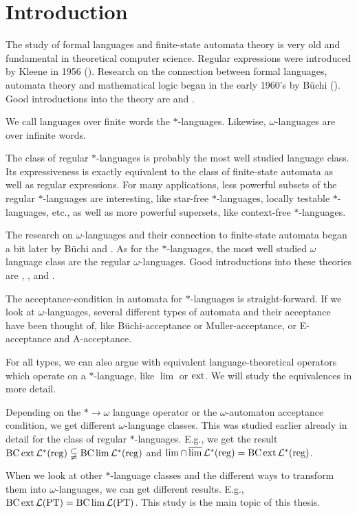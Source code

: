 
\section{Introduction}

The study of formal languages and finite-state automata theory is very old and fundamental in theoretical computer science. Regular expressions were introduced by Kleene in 1956 (\cite{Kleene56}). Research on the connection between formal languages, automata theory and mathematical logic began in the early 1960's by Büchi (\cite{Buchi60}). Good introductions into the theory are \cite{FinAutLogR109} and \cite{LangAutLogicR102}.

We call languages over finite words the $*$-languages. Likewise, $\omega$-languages are over infinite words.

The class of regular $*$-languages is probably the most well studied language class. Its expressiveness is exactly equivalent to the class of finite-state automata as well as regular expressions. For many applications, less powerful subsets of the regular $*$-languages are interesting, like star-free $*$-languages, locally testable $*$-languages, etc., as well as more powerful supersets, like context-free $*$-languages.

The research on $\omega$-languages and their connection to finite-state automata began a bit later by Büchi \cite{DecisionSOR111} and \cite{Muller63}. As for the $*$-languages, the most well studied $\omega$ language class are the regular $\omega$-languages. Good introductions into these theories are \cite{AutInfObjsR103}, \cite{InfCompR101}, \cite{OmLangR108} and \cite{InfWordsR110}.

The acceptance-condition in automata for $*$-languages is straight-forward. If we look at $\omega$-languages, several different types of automata and their acceptance have been thought of, like Büchi-acceptance or Muller-acceptance, or E-acceptance and A-acceptance.

For all types, we can also argue with equivalent language-theoretical operators which operate on a $*$-language, like $\lim$ or $\operatorname{ext}$. We will study the equivalences in more detail.

Depending on the $* \rightarrow \omega$ language operator or the $\omega$-automaton acceptance condition, we get different $\omega$-language classes. This was studied earlier already in detail for the class of regular $*$-languages. E.g., we get the result $\operatorname{BC} \operatorname{ext} \mathcal{L}^*(\textup{\textrm{reg}}) \subsetneqq \operatorname{BC} \lim \mathcal{L}^*(\textup{\textrm{reg}})$ and $\lim \cap \operatorname{\overline{lim}} \mathcal{L}^*(\textup{\textrm{reg}}) = \operatorname{BC} \operatorname{ext} \mathcal{L}^*(\textup{\textrm{reg}})$.

When we look at other $*$-language classes and the different ways to transform them into $\omega$-languages, we can get different results. E.g., $\operatorname{BC} \operatorname{ext} \mathcal{L}(\textup{\textrm{PT}}) = \operatorname{BC} \lim \mathcal{L}(\textup{\textrm{PT}})$. This study is the main topic of this thesis.
